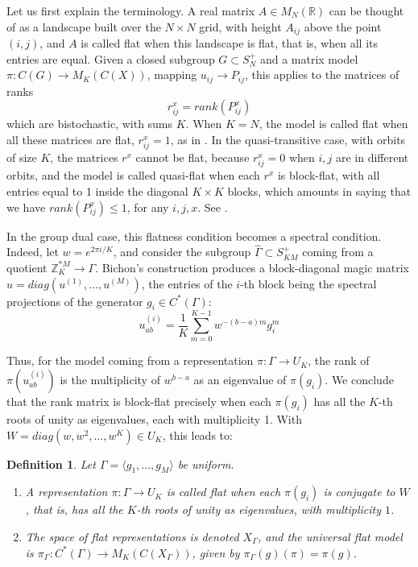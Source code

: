 \documentclass[12pt]{amsart}
\newtheorem{definition}[theorem]{Definition}
\theoremstyle{definition}
\begin{document}
Let us first explain the terminology. A real matrix $A\in M_N(\mathbb R)$ can be thought of as a landscape built over the $N\times N$ grid, with height $A_{ij}$ above the point $(i,j)$, and $A$ is called flat when this landscape is flat, that is, when all its entries are equal. Given a closed subgroup $G\subset S_N^+$ and a matrix model $\pi:C(G)\to M_K(C(X))$, mapping $u_{ij}\to P_{ij}$, this applies to the matrices of ranks
$$r^x_{ij}=rank(P_{ij}^x)$$
which are bistochastic, with sums $K$. When $K=N$, the model is called flat when all these matrices are flat, $r^x_{ij}=1$, as in \cite{bne}. In the quasi-transitive case, with orbits of size $K$, the matrices $r^x$ cannot be flat, because $r^x_{ij}=0$ when $i,j$ are in different orbits, and the model is called quasi-flat when each $r^x$ is block-flat, with all entries equal to 1 inside the diagonal $K\times K$ blocks, which amounts in saying that we have $rank(P_{ij}^x)\leq1$, for any $i,j,x$. See \cite{bc2,bfr}.

In the group dual case, this flatness condition becomes a spectral condition. Indeed, let $w=e^{2\pi i/K}$, and consider the subgroup $\widehat{\Gamma}\subset S_{KM}^+$ coming from a quotient $\mathbb Z_K^{*M}\to\Gamma$. Bichon's construction \cite{bic} produces a block-diagonal magic matrix $u=diag(u^{(1)},\ldots,u^{(M)})$, the entries of the $i$-th block being the spectral projections of the generator $g_i\in C^*(\Gamma)$:
$$u^{(i)}_{ab}=\frac{1}{K}\sum_{m=0}^{K-1}w^{-(b-a)m}g_i^m$$

Thus, for the model coming from a representation $\pi:\Gamma\to U_K$, the rank of $\pi(u^{(i)}_{ab})$ is the multiplicity of $w^{b-a}$ as an eigenvalue of $\pi(g_i)$. We conclude that the rank matrix is block-flat precisely when each $\pi(g_i)$ has all the $K$-th roots of unity as eigenvalues, each with multiplicity 1. With $W=diag(w,w^2,\ldots,w^K)\in U_K$, this leads to:

\begin{definition}
Let $\Gamma=\langle g_1,\ldots,g_M\rangle$ be uniform.
\begin{enumerate}
\item A representation $\pi:\Gamma\to U_K$ is called flat when each $\pi(g_i)$ is conjugate to $W$, that is, has all the $K$-th roots of unity as eigenvalues, with multiplicity $1$.

\item The space of flat representations is denoted $X_\Gamma$, and the universal flat model is $\pi_\Gamma:C^*(\Gamma)\to M_K(C(X_\Gamma))$, given by $\pi_\Gamma(g)(\pi)=\pi(g)$.
\end{enumerate}
\end{definition}
\end{document}

